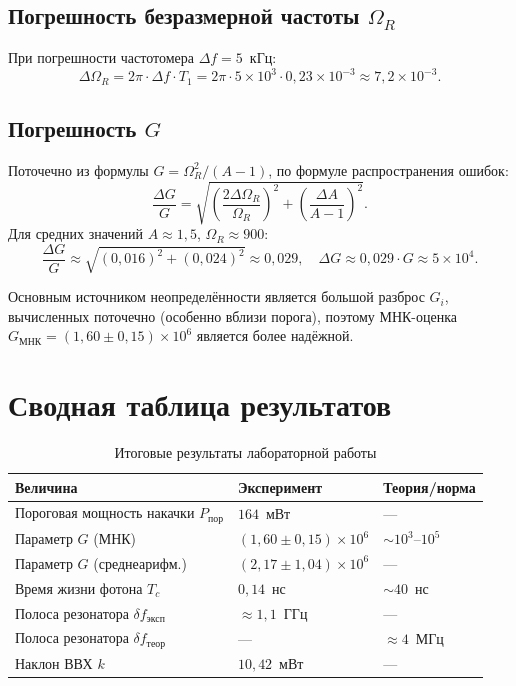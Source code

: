 \documentclass[12pt,a4paper]{article}
\begin{document}
\subsection{Погрешность безразмерной частоты $\Omega_R$}

При погрешности частотомера $\Delta f = 5$~кГц:
\begin{equation}
  \Delta\Omega_R = 2\pi \cdot \Delta f \cdot T_1 = 2\pi \cdot 5\times10^3 \cdot 0{,}23\times10^{-3}
  \approx 7{,}2\times10^{-3}.
\end{equation}

\subsection{Погрешность $G$}

Поточечно из формулы $G = \Omega_R^2/(A-1)$, по формуле распространения ошибок:
\begin{equation}
  \frac{\Delta G}{G} = \sqrt{\left(\frac{2\Delta\Omega_R}{\Omega_R}\right)^2
    + \left(\frac{\Delta A}{A-1}\right)^2}.
\end{equation}
Для средних значений $A \approx 1{,}5$, $\Omega_R \approx 900$:
\begin{equation}
  \frac{\Delta G}{G} \approx \sqrt{(0{,}016)^2 + (0{,}024)^2} \approx 0{,}029,
  \quad \Delta G \approx 0{,}029 \cdot G \approx 5\times10^4.
\end{equation}

Основным источником неопределённости является большой разброс $G_i$,
вычисленных поточечно (особенно вблизи порога), поэтому МНК-оценка
$G_\text{МНК} = (1{,}60 \pm 0{,}15)\times10^6$ является более надёжной.

\section{Сводная таблица результатов}

\begin{table}[H]
  \centering
  \caption{Итоговые результаты лабораторной работы}
  \label{tab:results}
  \begin{tabular}{lll}
    \toprule
    Величина & Эксперимент & Теория/норма \\
    \midrule
    Пороговая мощность накачки $P_\text{пор}$ & $164$~мВт & --- \\
    Параметр $G$ (МНК) & $(1{,}60 \pm 0{,}15)\times10^6$ & $\sim 10^3$--$10^5$ \\
    Параметр $G$ (среднеарифм.) & $(2{,}17 \pm 1{,}04)\times10^6$ & --- \\
    Время жизни фотона $T_c$ & $0{,}14$~нс & $\sim 40$~нс \\
    Полоса резонатора $\delta f_\text{эксп}$ & $\approx 1{,}1$~ГГц & --- \\
    Полоса резонатора $\delta f_\text{теор}$ & --- & $\approx 4$~МГц \\
    Наклон ВВХ $k$ & $10{,}42$~мВт & --- \\
    \bottomrule
  \end{tabular}
\end{table}
\end{document}
